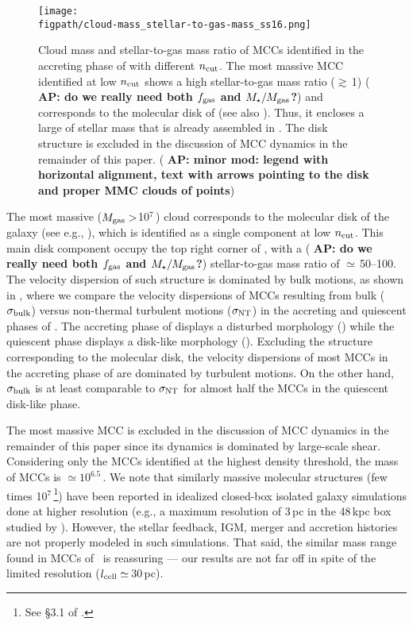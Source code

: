 \IfFileExists{emulateapjlegacy.cls}{\documentclass[iop]{emulateapjlegacy}}{\documentclass[iop]{emulateapj}}
\newcommand{\AP}[1]{({\bf \color{apcolor} AP: #1})}
\def\figpath{./Fig}
\begin{document}
\begin{figure}
\centering
\texttt{[image: \\figpath/cloud-mass\_stellar-to-gas-mass\_ss16.png]}
\caption{Cloud mass and stellar-to-gas mass ratio of MCCs identified in the accreting phase of \flower with different $n_{\rm cut}$. The most massive MCC identified at low $n_{\rm cut}$ shows a high stellar-to-gas mass ratio ($\gtrsim$\,1) \AP{do we really need both $f_{\rm gas}$ and $M_\star/M_{\rm gas}$?} and corresponds to the molecular disk of \flower (see also ).
%
Thus, it encloses a large of stellar mass that is already assembled in \flower. The disk structure is excluded in the discussion of MCC dynamics in the remainder of this paper. \AP{minor mod: legend with horizontal alignment, text with arrows pointing to the disk and proper MMC clouds of points}
\label{fig:stellarRatio16}}
\end{figure}

The most massive ($M_{\rm gas}>$10$^7$\,\Msun) cloud corresponds to the molecular disk of the galaxy (see e.g., ), 
which is identified as a single component at low $n_{\rm cut}$. This main disk component occupy the top right corner of , with a \AP{do we really need both $f_{\rm gas}$ and $M_\star/M_{\rm gas}$?} 
stellar-to-gas mass ratio of $\simeq$\,50--100. 
The velocity dispersion of such structure is dominated by bulk motions, as shown in , where we compare 
the velocity dispersions of MCCs resulting from bulk ($\sigma_{\rm bulk}$) versus non-thermal turbulent motions ($\sigma_{\rm NT}$) 
in the accreting and quiescent phases of \flower.
The accreting phase of \flower displays a disturbed morphology () while the 
quiescent phase displays a disk-like morphology ().
Excluding the structure corresponding to the molecular disk, the 
velocity dispersions of most MCCs in the accreting phase of \flower are dominated by turbulent motions.
On the other hand, $\sigma_{\rm bulk}$ is at least comparable to $\sigma_{\rm NT}$ for almost half the MCCs
in the quiescent disk-like phase.

The most massive MCC is excluded in the discussion of MCC dynamics in the remainder of this paper
since its dynamics is dominated by large-scale shear.
Considering only the MCCs identified at the highest density threshold, the mass of MCCs is $\simeq10^{6.5}$\,\Msun.
We note that similarly massive molecular structures (few times 10$^7$\,\Msun\footnote{See \S{3.1} of \citet{Behrendt16a}.}) 
have been reported in idealized closed-box isolated galaxy simulations done at higher resolution (e.g., a maximum resolution of 3\,pc in the 48\,kpc box studied by \citealt{Behrendt16a}). However, the stellar feedback, IGM, merger and accretion histories are not properly modeled in such simulations. That said, the similar mass range found in MCCs of \flower\ is reassuring --- our results are not far off in spite of the limited resolution ($l_{\rm cell}\simeq$\,30\,pc).
\end{document}
